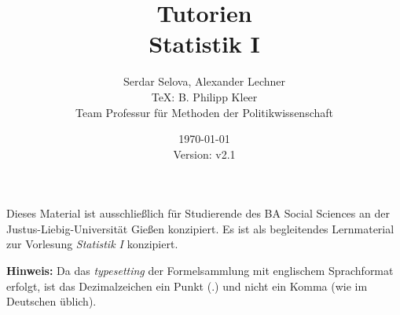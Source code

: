 \documentclass[11pt,a4paper]{article}
\author{Serdar Selova, Alexander Lechner \\ \TeX: B. Philipp Kleer \\ \footnotesize Team Professur für Methoden der Politikwissenschaft}
\title{%
  Tutorien \\
  \normalsize Statistik I \\
  }
\date{\today \\ \small{Version: v2.1}}
\begin{document}
\maketitle

Dieses Material ist ausschließlich für Studierende des BA Social Sciences an der Justus-Liebig-Universität Gießen konzipiert. Es ist als begleitendes Lernmaterial zur Vorlesung \textit{Statistik I} konzipiert.

\textbf{Hinweis:} Da das \textit{typesetting} der Formelsammlung mit englischem Sprachformat erfolgt, ist das Dezimalzeichen ein Punkt ($.$) und nicht ein Komma (wie im Deutschen üblich).

\tableofcontents 

\newpage



\newpage



\newpage



\newpage



\newpage



\newpage



\newpage



\newpage



\newpage


\end{document}
